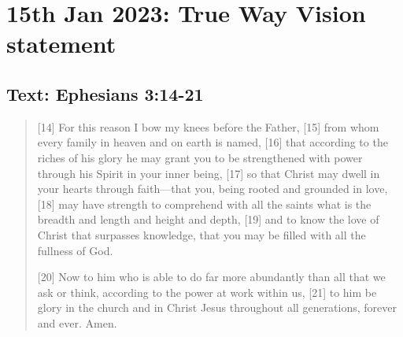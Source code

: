 \section{15th Jan 2023: True Way Vision statement}
\subsection*{Text: Ephesians 3:14-21}
  \begin{quote}
    [14] For this reason I bow my knees before the Father, [15] from whom every family in heaven and on earth is named, [16] that according to the riches of his glory he may grant you to be strengthened with power through his Spirit in your inner being, [17] so that Christ may dwell in your hearts through faith—that you, being rooted and grounded in love, [18] may have strength to comprehend with all the saints what is the breadth and length and height and depth, [19] and to know the love of Christ that surpasses knowledge, that you may be filled with all the fullness of God.

    [20] Now to him who is able to do far more abundantly than all that we ask or think, according to the power at work within us, [21] to him be glory in the church and in Christ Jesus throughout all generations, forever and ever. Amen.
  \end{quote}
